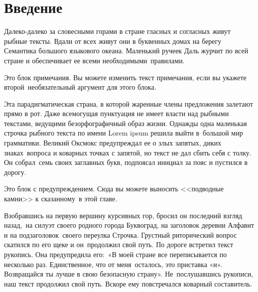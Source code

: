 \documentclass{scrartcl}
\begin{document}
\section*{Введение}
Далеко-далеко за словесными горами в стране гласных и согласных живут рыбные тексты.
Вдали от всех живут они в буквенных домах на берегу Семантика большого языкового океана.
Маленький ручеек Даль журчит по всей стране и обеспечивает ее всеми необходимыми\  
правилами.
\begin{info}
    Это блок примечания. Вы можете изменить текст примечания, если вы укажете второй\ 
    необязательный аргумент для этого блока.
\end{info}
Эта парадигматическая страна, в которой жаренные члены предложения залетают прямо в рот.
Даже всемогущая пунктуация не имеет власти над рыбными текстами, ведущими безорфографичный образ жизни.
Однажды одна маленькая строчка рыбного текста по имени Lorem ipsum решила выйти в\ 
большой мир грамматики. Великий Оксмокс предупреждал ее о злых запятых, диких знаках\ 
вопроса и коварных точках с запятой, но текст не дал сбить себя с толку. Он собрал\ 
семь своих заглавных букв, подпоясал инициал за пояс и пустился в дорогу.
\begin{warn}
    Это блок с предупреждением. Сюда вы можете выносить <<подводные камни>> к сказанному\ 
    в этой главе.
\end{warn}
Взобравшись на первую вершину курсивных гор, бросил он последний взгляд назад,\ 
на силуэт своего родного города Буквоград, на заголовок деревни Алфавит и на подзаголовок\ 
своего переулка Строчка. Грустный риторический вопрос скатился по его щеке и он\ 
продолжил свой путь. По дороге встретил текст рукопись. Она предупредила его:\ 
«В моей стране все переписывается по несколько раз. Единственное, что от меня\ 
осталось, это приставка «и». Возвращайся ты лучше в свою безопасную страну». Не\ 
послушавшись рукописи, наш текст продолжил свой путь. Вскоре ему повстречался коварный составитель.

\end{document}
